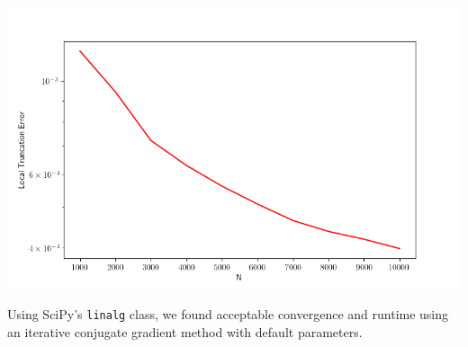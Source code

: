 \documentclass[11pt,reqno]{amsart}
\newcommand{\code}{\texttt}
\begin{document}
\begin{itemize}
    \begin{center}
        \includegraphics[scale=.7]{Figure_1.png}
    \end{center}\newline

    \noindent Using SciPy's \code{linalg} class, we found acceptable convergence and runtime using an iterative conjugate gradient method with default parameters. 
    
\end{itemize}
\end{document}
